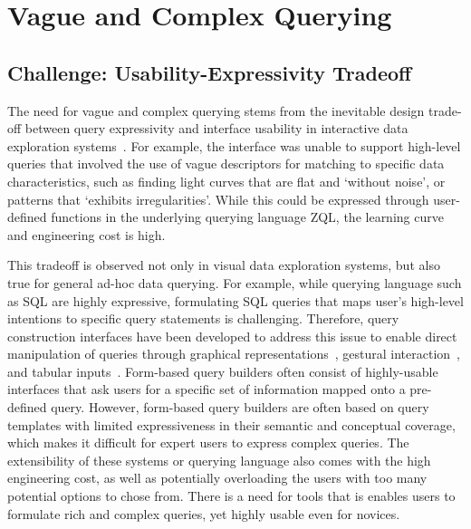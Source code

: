 \section{Vague and Complex Querying\label{sec:vague}}
\subsection{Challenge: Usability-Expressivity Tradeoff}
\par The need for vague and complex querying stems from the inevitable design trade-off between query expressivity and interface usability in interactive data exploration systems~\cite{Morton2014,Jagadish2007}. For example, the \zv interface was unable to support high-level queries that involved the use of vague descriptors for matching to specific data characteristics, such as finding light curves that are flat and `without noise', or patterns that `exhibits irregularities'. While this could be expressed through user-defined functions in the underlying querying language ZQL, the learning curve and engineering cost is high.
\par This tradeoff is observed not only in visual data exploration systems, but also true for general ad-hoc data querying. For example, while querying language such as SQL are highly expressive, formulating SQL queries that maps user's high-level intentions to specific query statements is challenging\cite{Jagadish2007,Khoussainova2010}. Therefore, query construction interfaces have been developed to address this issue to enable direct manipulation of queries through graphical representations~\cite{Abouzied2012}, gestural interaction~\cite{Nandi2013}, and tabular inputs~\cite{Zloof1975,Embley1989}. Form-based query builders often consist of highly-usable interfaces that ask users for a specific set of information mapped onto a pre-defined query. However, form-based query builders are often based on query templates with limited expressiveness in their semantic and conceptual coverage, which makes it difficult for expert users to express complex queries. The extensibility of these systems or querying language also comes with the high engineering cost, as well as potentially overloading the users with too many potential options to chose from. There is a need for tools that is enables users to formulate rich and complex queries, yet highly usable even for novices.  

